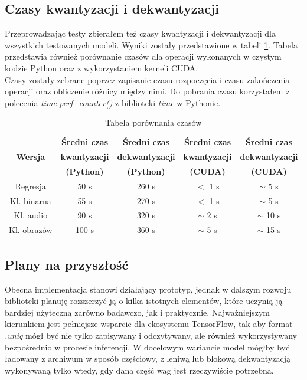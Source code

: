 \subsection{Czasy kwantyzacji i dekwantyzacji}
Przeprowadzając testy zbierałem też czasy kwantyzacji i dekwantyzacji dla wszystkich testowanych modeli. Wyniki zostały przedstawione w tabeli \ref{tab:quantization_dequantization_times}. Tabela przedstawia również porównanie czasów dla operacji wykonanych w czystym kodzie Python oraz z wykorzystaniem kerneli CUDA.\\
Czasy zostały zebrane poprzez zapisanie czasu rozpoczęcia i czasu zakończenia operacji oraz obliczenie różnicy między nimi. Do pobrania czasu korzystałem z polecenia \textit{time.perf\_counter()} z biblioteki \textit{time} w Pythonie.
\begin{table}[htbp]
	\centering
    \caption{Tabela porównania czasów}
    \label{tab:quantization_dequantization_times}
	\begin{tabular}{|c|c|c|c|c|}
		\hline
		   & \textbf{Średni czas} & \textbf{Średni czas} & \textbf{Średni czas} & \textbf{Średni czas}  \\
         \textbf{Wersja} & \textbf{kwantyzacji} & \textbf{dekwantyzacji} & \textbf{kwantyzacji} & \textbf{dekwantyzacji} \\
          & \textbf{(Python)} & \textbf{(Python)} & \textbf{(CUDA)} & \textbf{(CUDA)} \\
		\hline
		Regresja & 50 s & 260 s & $<$ 1 s & $\sim$ 5 s \\
		\hline
		Kl. binarna & 55 s & 270 s & $<$ 1 s & $\sim$ 5 s \\
        \hline
        Kl. audio & 90 s & 320 s & $\sim$ 2 s & $\sim$ 10 s \\
        \hline
        Kl. obrazów & 100 s & 360 s & $\sim$ 5 s & $\sim$ 15 s \\
		\hline
	\end{tabular}
\end{table}

\subsection{Plany na przyszłość}
Obecna implementacja stanowi działający prototyp, jednak w dalszym rozwoju biblioteki planuję rozszerzyć ją o kilka istotnych elementów, które uczynią ją bardziej użyteczną zarówno badawczo, jak i praktycznie. Najważniejszym kierunkiem jest pełniejsze wsparcie dla ekosystemu TensorFlow, tak aby format \textit{.uniq} mógł być nie tylko zapisywany i odczytywany, ale również wykorzystywany bezpośrednio w procesie inferencji. W docelowym wariancie model mógłby być ładowany z archiwum w sposób częściowy, z leniwą lub blokową dekwantyzacją wykonywaną tylko wtedy, gdy dana część wag jest rzeczywiście potrzebna.

